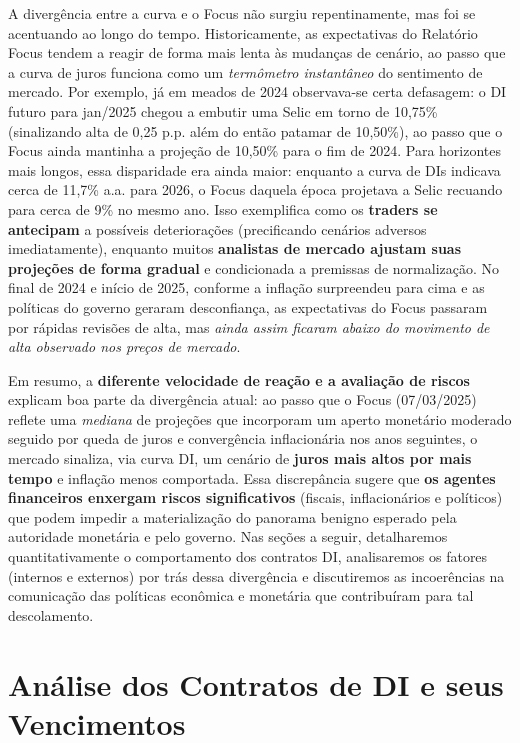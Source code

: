 \documentclass[a4paper,12pt]{article}
\begin{document}
A divergência entre a curva e o Focus não surgiu repentinamente, mas foi se acentuando ao longo do tempo. Historicamente, as expectativas do Relatório Focus tendem a reagir de forma mais lenta às mudanças de cenário, ao passo que a curva de juros funciona como um \emph{termômetro instantâneo} do sentimento de mercado. Por exemplo, já em meados de 2024 observava-se certa defasagem: o DI futuro para jan/2025 chegou a embutir uma Selic em torno de 10,75\% (sinalizando alta de 0,25 p.p. além do então patamar de 10,50\%), ao passo que o Focus ainda mantinha a projeção de 10,50\% para o fim de 2024. Para horizontes mais longos, essa disparidade era ainda maior: enquanto a curva de DIs indicava cerca de 11,7\% a.a. para 2026, o Focus daquela época projetava a Selic recuando para cerca de 9\% no mesmo ano. Isso exemplifica como os \textbf{traders se antecipam} a possíveis deteriorações (precificando cenários adversos imediatamente), enquanto muitos \textbf{analistas de mercado ajustam suas projeções de forma gradual} e condicionada a premissas de normalização. No final de 2024 e início de 2025, conforme a inflação surpreendeu para cima e as políticas do governo geraram desconfiança, as expectativas do Focus passaram por rápidas revisões de alta, mas \textit{ainda assim ficaram abaixo do movimento de alta observado nos preços de mercado}. 

Em resumo, a \textbf{diferente velocidade de reação e a avaliação de riscos} explicam boa parte da divergência atual: ao passo que o Focus (07/03/2025) reflete uma \textit{mediana} de projeções que incorporam um aperto monetário moderado seguido por queda de juros e convergência inflacionária nos anos seguintes, o mercado sinaliza, via curva DI, um cenário de \textbf{juros mais altos por mais tempo} e inflação menos comportada. Essa discrepância sugere que \textbf{os agentes financeiros enxergam riscos significativos} (fiscais, inflacionários e políticos) que podem impedir a materialização do panorama benigno esperado pela autoridade monetária e pelo governo. Nas seções a seguir, detalharemos quantitativamente o comportamento dos contratos DI, analisaremos os fatores (internos e externos) por trás dessa divergência e discutiremos as incoerências na comunicação das políticas econômica e monetária que contribuíram para tal descolamento.

\section{Análise dos Contratos de DI e seus Vencimentos}
\end{document}
